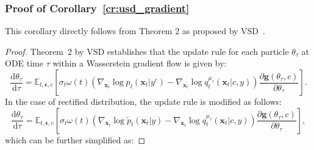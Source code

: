 \subsubsection{Proof of Corollary~\ref{cr:usd_gradient}}
This corollary directly follows from Theorem 2 as proposed by VSD~\citep{wang2024prolificdreamer}.
\begin{proof}
Theorem~2 by VSD establishes that the update rule for each particle $\theta_\tau$ at ODE time $\tau$ within a Wasserstein gradient flow is given by:
\begin{equation}\label{eq:vsd_update}
 \frac{\mathrm{d}\theta_\tau}{\mathrm{d}\tau}=\mathbb{E}_{t,\boldsymbol{\epsilon},c}\left[\sigma_t\omega(t)\left(\nabla_{\boldsymbol{x}_t}\log p_t(\boldsymbol{x}_t|y^c)-\nabla_{\boldsymbol{x}_t}\log q_t^{\mu_\tau}(\boldsymbol{x}_t|c,y)\right)\frac{\partial\boldsymbol{g}(\theta_\tau,c)}{\partial\theta_\tau}\right].
\end{equation}
In the case of rectified distribution, the update rule is modified as follows:
\begin{equation}\label{eq:usd_update}
 \frac{\mathrm{d}\theta_\tau}{\mathrm{d}\tau}=\mathbb{E}_{t,\boldsymbol{\epsilon},c}\left[\sigma_t\omega(t)\left(\nabla_{\boldsymbol{x}_t}\log \tilde{p}_t(\boldsymbol{x}_t|y)-\nabla_{\boldsymbol{x}_t}\log q_t^{\mu_\tau}(\boldsymbol{x}_t|c,y)\right)\frac{\partial\boldsymbol{g}(\theta_\tau,c)}{\partial\theta_\tau}\right],
\end{equation}
which can be further simplified as:


\end{proof}
